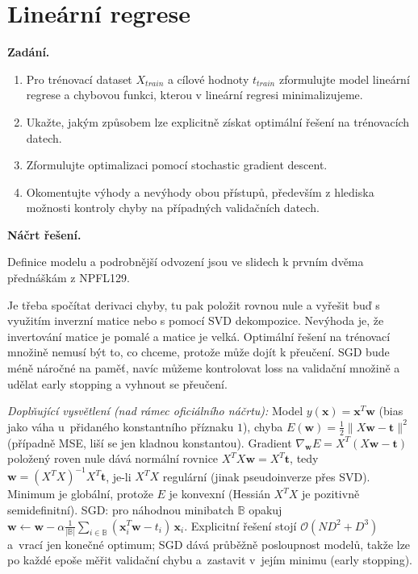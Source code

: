 \section{Lineární regrese}

\noindent\textbf{Zadání.}\par
\begin{enumerate}
  \item Pro trénovací dataset $X_{train}$ a cílové hodnoty $t_{train}$ zformulujte model lineární
    regrese a chybovou funkci, kterou v lineární regresi minimalizujeme.
  \item Ukažte, jakým způsobem lze explicitně získat optimální řešení na trénovacích datech.
  \item Zformulujte optimalizaci pomocí stochastic gradient descent.
  \item Okomentujte výhody a nevýhody obou přístupů, především z hlediska možnosti kontroly chyby
    na případných validačních datech.
\end{enumerate}

\medskip
\noindent\textbf{Náčrt řešení.}\par
Definice modelu a podrobnější odvození jsou ve slidech k prvním dvěma přednáškám z NPFL129.

Je třeba spočítat derivaci chyby, tu pak položit rovnou nule a vyřešit buď s využitím inverzní
matice nebo s pomocí SVD dekompozice. Nevýhoda je, že invertování matice je pomalé a matice je
velká. Optimální řešení na trénovací množině nemusí být to, co chceme, protože může dojít
k přeučení. SGD bude méně náročné na paměť, navíc můžeme kontrolovat loss na validační množině
a udělat early stopping a vyhnout se přeučení.

\medskip
\noindent\textit{Doplňující vysvětlení (nad rámec oficiálního náčrtu):} Model $y(\boldsymbol{x})=\boldsymbol{x}^T\boldsymbol{w}$ (bias jako váha u~přidaného konstantního příznaku $1$), chyba $E(\boldsymbol{w})=\frac12\|X\boldsymbol{w}-\boldsymbol{t}\|^2$ (případně MSE, liší se jen kladnou konstantou). Gradient $\nabla_{\boldsymbol{w}}E=X^T(X\boldsymbol{w}-\boldsymbol{t})$ položený roven nule dává normální rovnice $X^TX\boldsymbol{w}=X^T\boldsymbol{t}$, tedy $\boldsymbol{w}=(X^TX)^{-1}X^T\boldsymbol{t}$, je-li $X^TX$ regulární (jinak pseudoinverze přes SVD). Minimum je globální, protože $E$ je konvexní (Hessián $X^TX$ je pozitivně semidefinitní). SGD: pro náhodnou minibatch $\mathbb{B}$ opakuj $\boldsymbol{w}\leftarrow\boldsymbol{w}-\alpha\frac{1}{|\mathbb{B}|}\sum_{i\in\mathbb{B}}(\boldsymbol{x}_i^T\boldsymbol{w}-t_i)\,\boldsymbol{x}_i$. Explicitní řešení stojí $\mathcal{O}(ND^2+D^3)$ a~vrací jen konečné optimum; SGD dává průběžně posloupnost modelů, takže lze po každé epoše měřit validační chybu a~zastavit v~jejím minimu (early stopping).

